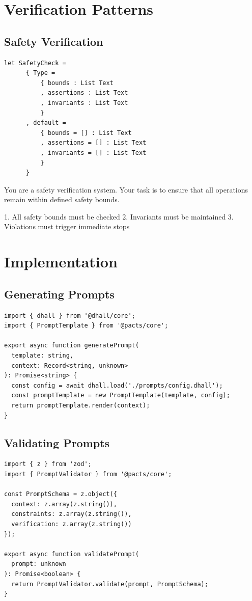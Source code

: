 \documentclass[11pt]{book}
\newenvironment{prompt}[1]
  {\begin{tcolorbox}[colback=promptcolor!5,colframe=promptcolor!50,title=Prompt: #1]}
  {\end{tcolorbox}}
\newenvironment{context}
  {\begin{tcolorbox}[colback=contextcolor!5,colframe=contextcolor!50,title=Context]}
  {\end{tcolorbox}}
\newenvironment{constraints}
  {\begin{tcolorbox}[colback=constraintcolor!5,colframe=constraintcolor!50,title=Constraints]}
  {\end{tcolorbox}}
\begin{document}
\chapter{Verification Patterns}

\section{Safety Verification}
\begin{prompt}{Safety Check}
\begin{verbatim}
let SafetyCheck =
      { Type =
          { bounds : List Text
          , assertions : List Text
          , invariants : List Text
          }
      , default =
          { bounds = [] : List Text
          , assertions = [] : List Text
          , invariants = [] : List Text
          }
      }
\end{verbatim}

\begin{context}
You are a safety verification system. Your task is to ensure that all operations remain within defined safety bounds.
\end{context}

\begin{constraints}
1. All safety bounds must be checked
2. Invariants must be maintained
3. Violations must trigger immediate stops
\end{constraints}
\end{prompt}

\chapter{Implementation}

\section{Generating Prompts}
\begin{verbatim}
import { dhall } from '@dhall/core';
import { PromptTemplate } from '@pacts/core';

export async function generatePrompt(
  template: string,
  context: Record<string, unknown>
): Promise<string> {
  const config = await dhall.load('./prompts/config.dhall');
  const promptTemplate = new PromptTemplate(template, config);
  return promptTemplate.render(context);
}
\end{verbatim}

\section{Validating Prompts}
\begin{verbatim}
import { z } from 'zod';
import { PromptValidator } from '@pacts/core';

const PromptSchema = z.object({
  context: z.array(z.string()),
  constraints: z.array(z.string()),
  verification: z.array(z.string())
});

export async function validatePrompt(
  prompt: unknown
): Promise<boolean> {
  return PromptValidator.validate(prompt, PromptSchema);
}
\end{verbatim}
\end{document}
